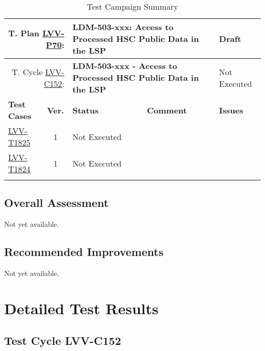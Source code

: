 \documentclass[DM,lsstdraft,STR,toc]{lsstdoc}
\begin{document}
{\small
\begin{longtable}{p{2cm}cp{2.3cm}p{8.6cm}p{2.3cm}}
\toprule
\multicolumn{2}{r}{ T. Plan \href{https://jira.lsstcorp.org/secure/Tests.jspa\#/testPlan/LVV-P70}{LVV-P70}:} &
\multicolumn{2}{p{10.9cm}}{\textbf{ LDM-503-xxx: Access to Processed HSC Public Data in the LSP }} & Draft \\\hline
\multicolumn{2}{r}{ T. Cycle \href{https://jira.lsstcorp.org/secure/Tests.jspa\#/testCycle/LVV-C152}{LVV-C152}:} &
\multicolumn{2}{p{10.9cm}}{\textbf{ LDM-503-xxx - Access to Processed HSC Public Data in the LSP }} & Not Executed \\\hline
\textbf{Test Cases} &  \textbf{Ver.} & \textbf{Status} & \textbf{Comment} & \textbf{Issues} \\\toprule
\href{https://jira.lsstcorp.org/secure/Tests.jspa#/testCase/LVV-T1825}{LVV-T1825}
&  1
& Not Executed &
\begin{minipage}[]{9cm}
\smallskip

\medskip
\end{minipage}
&
\\\hline
\href{https://jira.lsstcorp.org/secure/Tests.jspa#/testCase/LVV-T1824}{LVV-T1824}
&  1
& Not Executed &
\begin{minipage}[]{9cm}
\smallskip

\medskip
\end{minipage}
&
\\\hline
\caption{Test Campaign Summary}
\label{table:summary}
\end{longtable}
}

\subsection{Overall Assessment}
\label{sect:overallassessment}

Not yet available.

\subsection{Recommended Improvements}
\label{sect:recommendations}

Not yet available.

\newpage
\section{Detailed Test Results}
\label{sect:detailedtestresults}

\subsection{Test Cycle LVV-C152 }
\end{document}
